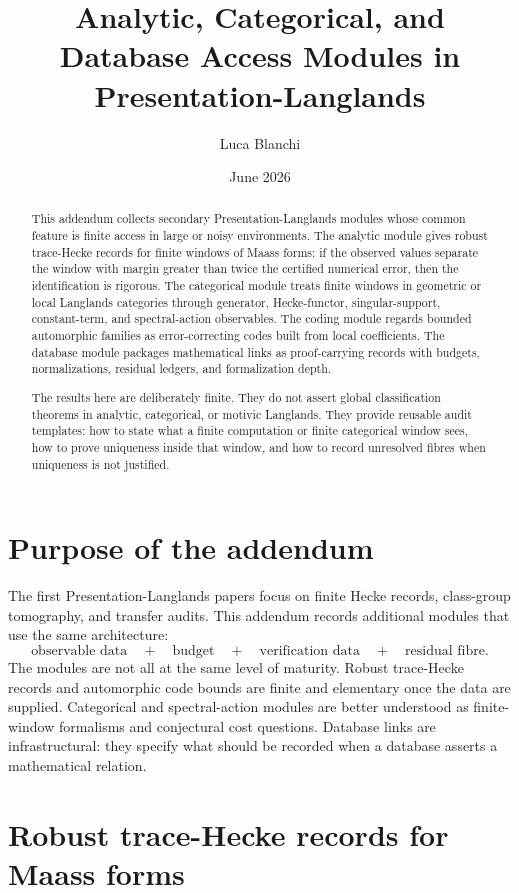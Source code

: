 \documentclass[11pt]{article}
\title{Analytic, Categorical, and Database Access Modules in Presentation-Langlands}
\author{Luca Blanchi}
\date{June 2026}
\begin{document}
\maketitle

\begin{abstract}
This addendum collects secondary Presentation-Langlands modules whose common feature is finite access in large or noisy environments.  The analytic module gives robust trace-Hecke records for finite windows of Maass forms: if the observed values separate the window with margin greater than twice the certified numerical error, then the identification is rigorous.  The categorical module treats finite windows in geometric or local Langlands categories through generator, Hecke-functor, singular-support, constant-term, and spectral-action observables.  The coding module regards bounded automorphic families as error-correcting codes built from local coefficients.  The database module packages mathematical links as proof-carrying records with budgets, normalizations, residual ledgers, and formalization depth.

The results here are deliberately finite.  They do not assert global classification theorems in analytic, categorical, or motivic Langlands.  They provide reusable audit templates: how to state what a finite computation or finite categorical window sees, how to prove uniqueness inside that window, and how to record unresolved fibres when uniqueness is not justified.
\end{abstract}

\section{Purpose of the addendum}

The first Presentation-Langlands papers focus on finite Hecke records, class-group tomography, and transfer audits.  This addendum records additional modules that use the same architecture:
\[
\text{observable data}
\quad+\quad
\text{budget}
\quad+\quad
\text{verification data}
\quad+\quad
\text{residual fibre}.
\]
The modules are not all at the same level of maturity.  Robust trace-Hecke records and automorphic code bounds are finite and elementary once the data are supplied.  Categorical and spectral-action modules are better understood as finite-window formalisms and conjectural cost questions.  Database links are infrastructural: they specify what should be recorded when a database asserts a mathematical relation.

\section{Robust trace-Hecke records for Maass forms}
\end{document}
